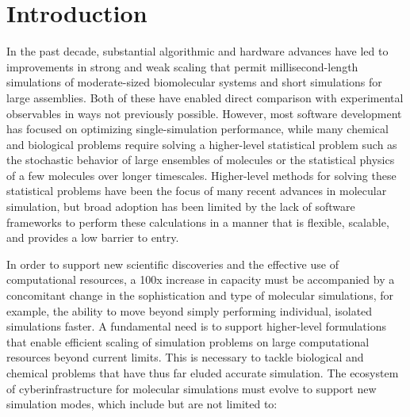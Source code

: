 \documentclass[10pt,letterpaper,draft]{article}
\begin{document}
\vspace{0.15in}

\section*{Introduction}

In the past decade, substantial algorithmic and hardware advances have led to improvements in strong and weak scaling that permit millisecond-length simulations of moderate-sized biomolecular systems and short simulations for large assemblies.  Both of these have enabled direct comparison with experimental observables in ways not previously possible.  However, most software development has focused on optimizing single-simulation performance, while many chemical and biological problems require solving a higher-level statistical problem such as the stochastic behavior of large ensembles of molecules or the statistical physics of a few molecules over longer timescales.  Higher-level methods for solving these statistical problems have been the focus of many recent advances in molecular simulation, but broad adoption has been limited by the lack  of software frameworks to perform these calculations in a manner that is flexible, scalable, and provides a low barrier to entry.  

In order to support new scientific discoveries and the effective use of computational resources, a 100x increase in capacity must be accompanied by a concomitant change in the  sophistication and type of molecular simulations, for example, the ability to move beyond simply performing individual, isolated simulations faster. A fundamental need is to support higher-level formulations that enable efficient scaling of simulation problems on large computational resources beyond current limits.  This is necessary to tackle biological and chemical problems that have thus far eluded accurate simulation.  The ecosystem of cyberinfrastructure for molecular simulations must evolve to support new simulation modes, which include but are not limited to: 

\setcounter{page}{1} \pagestyle{plain} 


\end{document}
